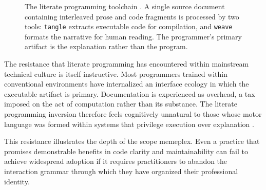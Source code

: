 \documentclass[11pt]{article}
\theoremstyle{definition}
\begin{document}
\begin{figure}[h]
\centering
{}
\caption{The literate programming toolchain \cite{knuth1984}. A single
source document containing interleaved prose and code fragments is
processed by two tools: \texttt{tangle} extracts executable code for
compilation, and \texttt{weave} formats the narrative for human reading.
The programmer's primary artifact is the explanation rather than the
program.}
\label{fig:literate}
\end{figure}

The resistance that literate programming has encountered within
mainstream technical culture is itself instructive. Most programmers
trained within conventional environments have internalized an interface
ecology in which the executable artifact is primary. Documentation is
experienced as overhead, a tax imposed on the act of computation rather
than its substance. The literate programming inversion therefore feels
cognitively unnatural to those whose motor language was formed within
systems that privilege execution over explanation \cite{brooks1975}.

This resistance illustrates the depth of the scope memeplex. Even a
practice that promises demonstrable benefits in code clarity and
maintainability can fail to achieve widespread adoption if it requires
practitioners to abandon the interaction grammar through which they have
organized their professional identity.
\end{document}
